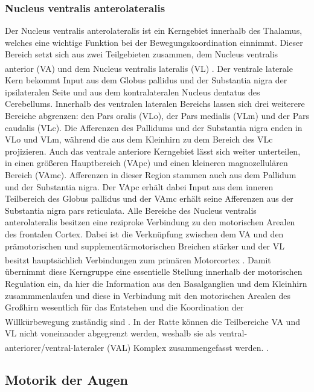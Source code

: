 \documentclass[12pt,a4paper,pdftex]{article}
\begin{document}
\subsubsection{Nucleus ventralis anterolateralis} 
Der Nucleus ventralis anterolateralis ist ein Kerngebiet innerhalb des Thalamus, welches eine wichtige Funktion bei der Bewegungskoordination einnimmt. Dieser Bereich setzt sich aus zwei Teilgebieten zusammen, dem Nucleus ventralis anterior (VA) und dem Nucleus ventralis lateralis (VL) \textsuperscript{\cite[8]{trepel2011neuroanatomie}}. Der ventrale laterale Kern bekommt Input aus dem  Globus pallidus und der Substantia nigra der ipsilateralen Seite und aus dem kontralateralen Nucleus dentatus des Cerebellums. Innerhalb des ventralen lateralen Bereichs lassen sich drei weiterere Bereiche abgrenzen: den Pars oralis (VLo), der Pars medialis (VLm) und der Pars caudalis (VLc). Die Afferenzen des Pallidums und der Substantia nigra enden in VLo und VLm, während die aus dem Kleinhirn zu dem Bereich des VLc projizieren. Auch das ventrale anteriore Kerngebiet lässt sich weiter unterteilen, in einen größeren Hauptbereich (VApc) und einen kleineren magnozellulären Bereich (VAmc). Afferenzen in dieser Region stammen auch aus dem Pallidum und der Substantia nigra. Der VApc erhält dabei Input aus dem inneren Teilbereich des Globus pallidus und der VAmc erhält seine Afferenzen aus der Substantia nigra pars reticulata. Alle Bereiche des Nucleus ventralis anterolateralis besitzen eine reziproke Verbindung zu den motorischen Arealen des frontalen Cortex. Dabei ist die Verknüpfung zwischen dem VA und den prämotorischen und supplementärmotorischen Breichen stärker und der VL besitzt hauptsächlich Verbindungen zum primären Motorcortex \textsuperscript{\cite[12]{crossman2014neuroanatomy}}. Damit übernimmt diese Kerngruppe eine essentielle Stellung innerhalb der motorischen Regulation ein, da hier die Information aus den Basalganglien und dem Kleinhirn zusammmenlaufen und diese in Verbindung mit den motorischen Arealen des Großhirn wesentlich für das Entstehen und die Koordination der Willkürbewegung zuständig sind \textsuperscript{\cite[8]{trepel2011neuroanatomie}}. In der Ratte können die Teilbereiche VA und VL nicht voneinander abgegrenzt werden, weshalb sie als ventral-anteriorer/ventral-lateraler (VAL) Komplex zusammengefasst werden. \textsuperscript{\cite[16]{paxinos2014rat}}.     

\subsection{Motorik der Augen}
\end{document}
